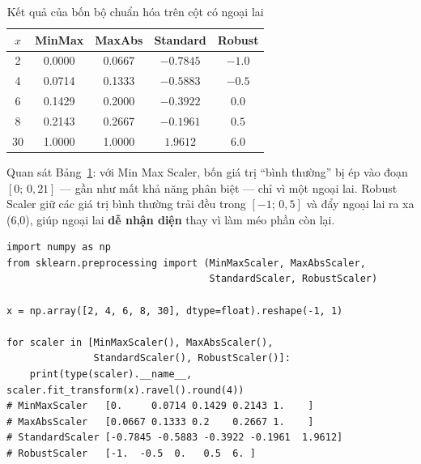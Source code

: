 \begin{table}[H]
\centering
\begin{tabular}{|c|c|c|c|c|}
\hline
$x$ & \textbf{MinMax} & \textbf{MaxAbs} & \textbf{Standard} & \textbf{Robust} \\
\hline
2  & 0.0000 & 0.0667 & $-0.7845$ & $-1.0$ \\ \hline
4  & 0.0714 & 0.1333 & $-0.5883$ & $-0.5$ \\ \hline
6  & 0.1429 & 0.2000 & $-0.3922$ & $0.0$ \\ \hline
8  & 0.2143 & 0.2667 & $-0.1961$ & $0.5$ \\ \hline
30 & 1.0000 & 1.0000 & $1.9612$ & $6.0$ \\ \hline
\end{tabular}
\caption{Kết quả của bốn bộ chuẩn hóa trên cột có ngoại lai}
\label{tab:scalers}
\end{table}

Quan sát Bảng~\ref{tab:scalers}: với Min Max Scaler, bốn giá trị ``bình thường'' bị ép vào đoạn $[0;\,0{,}21]$ --- gần như mất khả năng phân biệt --- chỉ vì một ngoại lai. Robust Scaler giữ các giá trị bình thường trải đều trong $[-1;\,0{,}5]$ và đẩy ngoại lai ra xa (6,0), giúp ngoại lai \textbf{dễ nhận diện} thay vì làm méo phần còn lại.

\begin{lstlisting}[caption={So sánh bốn bộ chuẩn hóa trong scikit-learn}]
import numpy as np
from sklearn.preprocessing import (MinMaxScaler, MaxAbsScaler,
                                   StandardScaler, RobustScaler)

x = np.array([2, 4, 6, 8, 30], dtype=float).reshape(-1, 1)

for scaler in [MinMaxScaler(), MaxAbsScaler(),
               StandardScaler(), RobustScaler()]:
    print(type(scaler).__name__, scaler.fit_transform(x).ravel().round(4))
# MinMaxScaler   [0.     0.0714 0.1429 0.2143 1.    ]
# MaxAbsScaler   [0.0667 0.1333 0.2    0.2667 1.    ]
# StandardScaler [-0.7845 -0.5883 -0.3922 -0.1961  1.9612]
# RobustScaler   [-1.  -0.5  0.   0.5  6. ]
\end{lstlisting}


